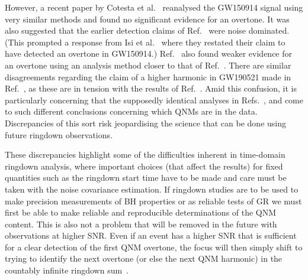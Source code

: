 However, a recent paper by Cotesta et al.~\cite{Cotesta:2022pci} reanalysed the GW150914 signal using very similar methods and found no significant evidence for an overtone.
It was also suggested that the earlier detection claims of Ref.~\cite{Isi:2019aib} were noise dominated.
(This prompted a response from Isi et al.~\cite{Isi:2022mhy} where they restated their claim to have detected an overtone in GW150914.) 
Ref.~\cite{Bustillo:2020buq} also found weaker evidence for an overtone using an analysis method closer to that of Ref.~\cite{LIGOScientific:2016lio}.
There are similar disagreements regarding the claim of a higher harmonic in GW190521 made in Ref.~\cite{Capano:2021etf}, as these are in tension with the results of Ref.~\cite{LIGOScientific:2021sio}.
Amid this confusion, it is particularly concerning that the supposedly identical analyses in Refs.~\cite{Isi:2019aib, Isi:2022mhy}, and \cite{Cotesta:2022pci} come to such different conclusions concerning which QNMs are in the data. 
Discrepancies of this sort risk jeopardising the science that can be done using future ringdown observations.

These discrepancies highlight some of the difficulties inherent in time-domain ringdown analysis, where important choices (that affect the results) for fixed quantities such as the ringdown start time have to be made and care must be taken with the noise covariance estimation.
If ringdown studies are to be used to make precision measurements of BH properties or as reliable tests of GR we must first be able to make reliable and reproducible determinations of the QNM content.
This is also not a problem that will be removed in the future with observations at higher SNR. Even if an event has a higher SNR that is sufficient for a clear detection of the first QNM overtone, the focus will then simply shift to trying to identify the next overtone (or else the next QNM harmonic) in the countably infinite ringdown sum~\cite{Bustillo:2020buq}.

